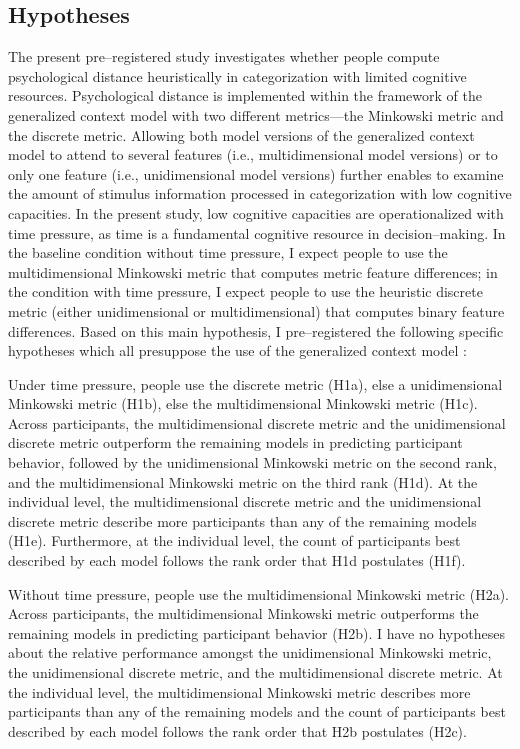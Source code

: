 \documentclass[a4paper,man,natbib]{apa6}
\begin{document}
\subsection{Hypotheses}
The present pre--registered study investigates whether people compute psychological distance heuristically in categorization with limited cognitive resources. Psychological distance is implemented within the framework of the generalized context model \citep{nosofsky1989further} with two different metrics---the Minkowski metric and the discrete metric. Allowing both model versions of the generalized context model to attend to several features (i.e., multidimensional model versions) or to only one feature (i.e., unidimensional model versions) further enables to examine the amount of stimulus information processed in categorization with low cognitive capacities. In the present study, low cognitive capacities are operationalized with time pressure, as time is a fundamental cognitive resource in decision--making. In the baseline condition without time pressure, I expect people to use the multidimensional Minkowski metric that computes metric feature differences; in the condition with time pressure, I expect people to use the heuristic discrete metric (either unidimensional or multidimensional) that computes binary feature differences. Based on this main hypothesis, I pre--registered the following specific hypotheses which all presuppose the use of the generalized context model \citep{nosofsky1989further}: 

Under time pressure, people use the discrete metric (H1a), else a unidimensional Minkowski metric (H1b), else the multidimensional Minkowski metric (H1c). Across participants, the multidimensional discrete metric and the unidimensional discrete metric outperform the remaining models in predicting participant behavior, followed by the unidimensional Minkowski metric on the second rank, and the multidimensional Minkowski metric on the third rank (H1d). At the individual level, the multidimensional discrete metric and the unidimensional discrete metric describe more participants than any of the remaining models (H1e). Furthermore, at the individual level, the count of participants best described by each model follows the rank order that H1d postulates (H1f). 

Without time pressure, people use the multidimensional Minkowski metric (H2a). Across participants, the multidimensional Minkowski metric outperforms the remaining models in predicting participant behavior (H2b). I have no hypotheses about the relative performance amongst the unidimensional Minkowski metric, the unidimensional discrete metric, and the multidimensional discrete metric. At the individual level, the multidimensional Minkowski metric describes more participants than any of the remaining models and the count of participants best described by each model follows the rank order that H2b postulates (H2c).
\end{document}
